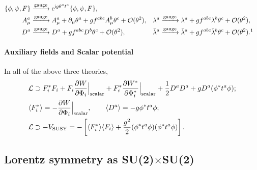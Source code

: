 \documentclass[CheatSheet]{subfiles}
\begin{document}
\begin{align*}
   \{\phi,\psi,F\}&\xrightarrow{\text{gauge}} \ee^{\ii g \theta^at^a}\{\phi,\psi,F\},\\
   A_\mu^a&\xrightarrow{\text{gauge}} A^a_\mu+\partial_\mu \theta^a
   + g f^{abc}A_\mu^b\theta^c  + \Order(\theta^2),
 &\lambda^a&\xrightarrow{\text{gauge}}\lambda^a+gf^{abc}\lambda^b\theta^c+\Order(\theta^2),
 \\
 D^a&\xrightarrow{\text{gauge}} D^a+gf^{abc}D^b\theta^c+\Order(\theta^2),
& \blambda^a&\xrightarrow{\text{gauge}}\blambda^a+gf^{abc}\blambda^b\theta^c + \Order(\theta^2).
\footnotemark
\end{align*}

\paragraph{Auxiliary fields and Scalar potential}
In all of the above three theories,
\begin{align}
& \mathcal L\supset
F^*_i F_i
+ F_i\frac{\partial W}{\partial \Phi_i}\Big|_{\text{scalar}}
+ F_i^*\frac{\partial W^*}{\partial \Phi_i^*}\Big|_{\text{scalar}}
+\frac12 D^aD^a + g D^a(\phi^*t^a\phi);
\\&
 \langle F^*_i\rangle = -\frac{\partial W}{\partial \Phi_i}\Big|_{\text{scalar}},\qquad
 \langle D^a\rangle = -g\phi^*t^a\phi;
\\&
 \mathcal L\supset -V_{\text{SUSY}} = -
\left[\langle F^*_i\rangle\langle F_i\rangle+\frac{g^2}2 (\phi^*t^a\phi)(\phi^*t^a\phi)\right].
\end{align}



\clearpage
\detailstyle

\subsection[Lorentz symmetry as SU(2) x SU(2)]{Lorentz symmetry as SU(2)$\times$SU(2)}
\end{document}
